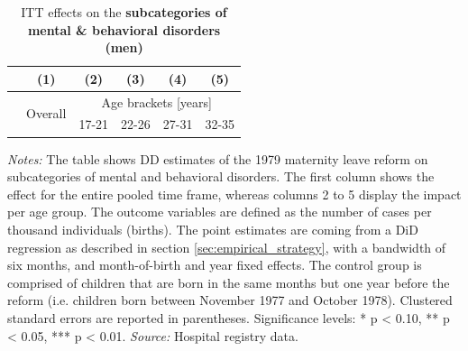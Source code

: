 \documentclass[11pt, a4paper]{article} %
\begin{document}
\newpage
{} 
\vspace*{\fill}
\begin{table}[H] \centering 
	\begin{threeparttable} \centering \caption{ITT effects on the \textbf{subcategories of mental \& behavioral disorders (men)}}\label{tab: ITT_across_d5subcategories_per_age_group_men}
		{\def\sym#1{\ifmmode^{#1}\else\(^{#1}\)\fi} 
			\begin{tabular}{l*{5}{c}}
				\toprule 
				&\multicolumn{1}{c}{(1)}&\multicolumn{1}{c}{(2)}&\multicolumn{1}{c}{(3)}&\multicolumn{1}{c}{(4)}&\multicolumn{1}{c}{(5)}\\
				\midrule
				&\multirow{2}{*}{Overall} & \multicolumn{4}{c}{Age brackets [years]} \\ 
				\cmidrule(lr){3-6}
				&&\multicolumn{1}{c}{17-21}&\multicolumn{1}{c}{22-26}&\multicolumn{1}{c}{27-31}&\multicolumn{1}{c}{32-35}\\
				
				\midrule
				
				
				
				\bottomrule 
		\end{tabular}}
	\end{threeparttable} 
	\begin{minipage}{0.9\linewidth}
		\scriptsize \emph{Notes:} The table shows DD estimates of the 1979 maternity leave reform on subcategories of mental and behavioral disorders. The first column shows the effect for the entire pooled time frame, whereas columns 2 to 5 display the impact per age group. The outcome variables are defined as the number of cases per thousand individuals (births). The point estimates are coming from a DiD regression as described in section \ref{sec:empirical_strategy}, with a bandwidth of six months, and month-of-birth and year fixed effects. The control group is comprised of children that are born in the same months but one year before the reform (i.e. children born between November 1977 and October 1978). Clustered standard errors are reported in parentheses. \newline Significance levels: * p < 0.10, ** p < 0.05, *** p < 0.01. \newline 	\emph{Source:} Hospital registry data.
	\end{minipage}
\end{table} 
\vspace*{\fill}\clearpage 
\restoregeometry
\end{document}
